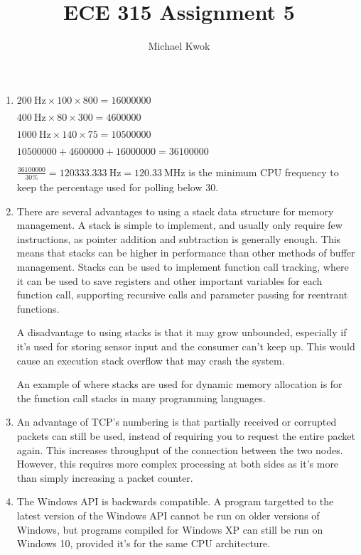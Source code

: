 \documentclass{article}
\title{ECE 315 Assignment 5}
\author{Michael Kwok}
\begin{document}
\maketitle
\begin{enumerate}
  \item \(\SI{200}{\hertz} \times 100 \times 800 = 16 000 000\)

        \(\SI{400}{\hertz} \times 80 \times 300 = 4 600 000\)

        \(\SI{1000}{\hertz} \times 140 \times 75 = 10 500 000\)

        \(10500000 + 4600000 + 16000000 = 36100000\)

        \(\frac{36100000}{30\%} = \SI{120333.333}{\hertz} = \SI{120.33}{\mega\hertz}\) is the minimum CPU frequency to keep the percentage used for polling below 30.
  \item There are several advantages to using a stack data structure for memory management. A stack is simple to implement, and usually only require few instructions, as pointer addition and subtraction is generally enough. This means that stacks can be higher in performance than other methods of buffer management. Stacks can be used to implement function call tracking, where it can be used to save registers and other important variables for each function call, supporting recursive calls and parameter passing for reentrant functions.

        A disadvantage to using stacks is that it may grow unbounded, especially if it's used for storing sensor input and the consumer can't keep up. This would cause an execution stack overflow that may crash the system.

        An example of where stacks are used for dynamic memory allocation is for the function call stacks in many programming languages.

  \item An advantage of TCP's numbering is that partially received or corrupted packets can still be used, instead of requiring you to request the entire packet again. This increases throughput of the connection between the two nodes. However, this requires more complex processing at both sides as it's more than simply increasing a packet counter.

  \item The Windows API is backwards compatible. A program targetted to the latest version of the Windows API cannot be run on older versions of Windows, but programs compiled for Windows XP can still be run on Windows 10, provided it's for the same CPU architecture.


\end{enumerate}
\end{document}
